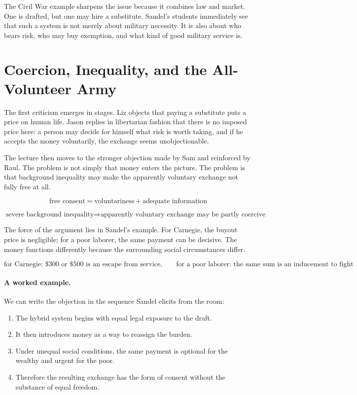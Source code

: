 The Civil War example sharpens the issue because it combines law and market. One is drafted, but one may hire a substitute. Sandel's students immediately see that such a system is not merely about military necessity. It is also about who bears risk, who may buy exemption, and what kind of good military service is.

\section{Coercion, Inequality, and the All-Volunteer Army}

The first criticism emerges in stages. Liz objects that paying a substitute puts a price on human life. Jason replies in libertarian fashion that there is no imposed price here: a person may decide for himself what risk is worth taking, and if he accepts the money voluntarily, the exchange seems unobjectionable.

The lecture then moves to the stronger objection made by Sam and reinforced by Raul. The problem is not simply that money enters the picture. The problem is that background inequality may make the apparently voluntary exchange not fully free at all.

\begin{equation}
\text{free consent} = \text{voluntariness} + \text{adequate information}
\end{equation}

\begin{equation}
\text{severe background inequality} \Longrightarrow
\text{apparently voluntary exchange may be partly coercive}
\end{equation}

The force of the argument lies in Sandel's example. For Carnegie, the buyout price is negligible; for a poor laborer, the same payment can be decisive. The money functions differently because the surrounding social circumstances differ.

\begin{equation}
\text{for Carnegie: } \text{\$300 or \$500 is an escape from service},\qquad
\text{for a poor laborer: the same sum is an inducement to fight}
\end{equation}

\paragraph{A worked example.} We can write the objection in the sequence Sandel elicits from the room:
\begin{enumerate}
\item The hybrid system begins with equal legal exposure to the draft.
\item It then introduces money as a way to reassign the burden.
\item Under unequal social conditions, the same payment is optional for the wealthy and urgent for the poor.
\item Therefore the resulting exchange has the form of consent without the substance of equal freedom.
\end{enumerate}

